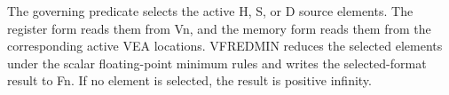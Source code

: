 The governing predicate selects the active H, S, or D source elements.
The register form reads them from Vn, and the memory form reads them from the
corresponding active VEA locations. VFREDMIN reduces the selected elements
under the scalar floating-point minimum rules and writes the selected-format
result to Fn. If no element is selected, the result is positive infinity.
